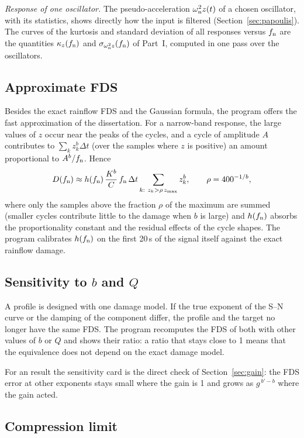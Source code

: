 \emph{Response of one oscillator.} The pseudo-acceleration $\omega_{\mathrm{n}}^2z(t)$ of a chosen oscillator, with
its statistics, shows directly how the input is filtered (Section~\ref{sec:papoulis}). The curves
of the kurtosis and standard deviation of all responses versus $f_{\mathrm{n}}$ are the quantities $\kappa_z(f_{\mathrm{n}})$
and $\sigma_{\omega_{\mathrm{n}}^2 z}(f_{\mathrm{n}})$ of Part~I, computed in one pass over the oscillators.

\subsection{Approximate FDS}

Besides the exact rainflow FDS and the Gaussian formula, the program offers the fast approximation of
the dissertation. For a narrow-band response, the large values of $z$ occur near the peaks of the
cycles, and a cycle of amplitude $A$ contributes to $\sum_kz_k^b\Delta t$ (over the samples where $z$ is
positive) an amount proportional to $A^b/f_{\mathrm{n}}$. Hence
\begin{equation}
  D(f_{\mathrm{n}}) \approx h(f_{\mathrm{n}})\,\frac{K^b}{C}\,f_{\mathrm{n}}\,\Delta t\sum_{k:\ z_k>\rho\,z_{\max}} z_k^b ,
  \qquad \rho = 400^{-1/b},
\end{equation}
where only the samples above the fraction $\rho$ of the maximum are summed (smaller cycles contribute
little to the damage when $b$ is large) and $h(f_{\mathrm{n}})$ absorbs the proportionality constant and the
residual effects of the cycle shapes. The program calibrates $h(f_{\mathrm{n}})$ on the first 20\,s of the
signal itself against the exact rainflow damage.

\subsection{Sensitivity to $b$ and $Q$}

A profile is designed with one damage model. If the true exponent of the S--N curve or the damping
of the component differ, the profile and the target no longer have the same FDS. The program
recomputes the FDS of both with other values of $b$ or $Q$ and shows their ratio: a ratio that stays
close to 1 means that the equivalence does not depend on the exact damage model.

For an  result the sensitivity card is the direct check of Section~\ref{sec:gain}: the FDS
error at other exponents stays small where the gain is 1 and grows as $g^{\,b'-b}$ where the gain acted.

\subsection{Compression limit}

